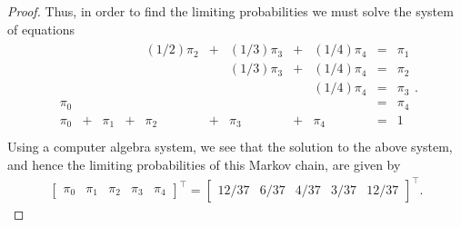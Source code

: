 \begin{proof}
  Thus, in order to find the limiting probabilities we must solve the system of equations
  \begin{align*}
    \begin{array}{rrrrrrrrrrr}
                 & &            & & (1/2)\pi_2 &+& (1/3)\pi_3 &+& (1/4)\pi_4 &=& \pi_1 \\
                 & &            & &            & & (1/3)\pi_3 &+& (1/4)\pi_4 &=& \pi_2 \\
                 & &            & &            & &            & & (1/4)\pi_4 &=& \pi_3 \\
      \pi_0      & &            & &            & &            & &            &=& \pi_4 \\
      \pi_0      &+& \pi_1      &+& \pi_2      &+& \pi_3      &+& \pi_4      &=& 1 \\
    \end{array}.
  \end{align*}
  Using a computer algebra system, we see that the solution to the above system,
  and hence the limiting probabilities of this Markov chain, are given by
  \begin{align*}
    \begin{bmatrix}
      \pi_0 & \pi_1 & \pi_2 & \pi_3 & \pi_4
    \end{bmatrix}^\intercal
    =
    \begin{bmatrix}
      12/37 & 6/37 & 4/37 & 3/37 & 12/37
    \end{bmatrix}^\intercal.
  \end{align*}
\end{proof}
\newpage
